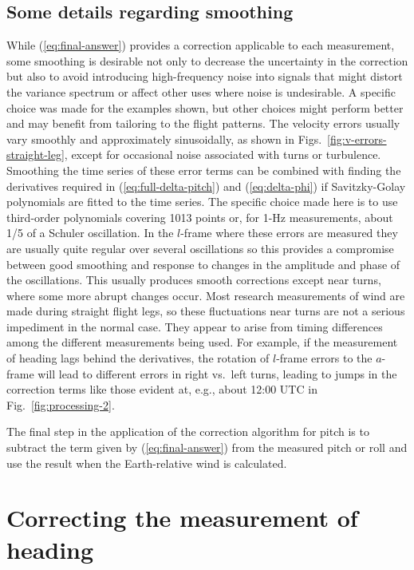 \documentclass[english,british,amt,bookmarks=false,unicode=true]{copernicus}\usepackage[]{graphicx}\usepackage[]{color}
\begin{document}
\subsection{Some details regarding smoothing}

While (\ref{eq:final-answer}) provides a correction applicable to
each measurement, some smoothing is desirable not only to decrease
the uncertainty in the correction but also to avoid introducing high-frequency
noise into signals that might distort the variance spectrum or affect
other uses where noise is undesirable. A specific choice was made
for the examples shown, but other choices might perform better and
may benefit from tailoring to the flight patterns. The velocity errors
usually vary smoothly and approximately sinusoidally, as shown in
Figs.~\ref{fig:v-errors-straight-leg}, except for occasional noise
associated with turns or turbulence. Smoothing the time series of
these error terms can be combined with finding the derivatives required
in (\ref{eq:full-delta-pitch}) and (\ref{eq:delta-phi}) if Savitzky-Golay
polynomials are fitted to the time series. The specific choice made
here is to use third-order polynomials covering 1013 points or, for
1-Hz measurements, about 1/5 of a Schuler oscillation. In the $l$-frame
where these errors are measured they are usually quite regular over
several oscillations so this provides a compromise between good smoothing
and response to changes in the amplitude and phase of the oscillations.
This usually produces smooth corrections except near turns, where
some more abrupt changes occur. Most research measurements of wind
are made during straight flight legs, so these fluctuations near turns
are not a serious impediment in the normal case. They appear to arise
from timing differences among the different measurements being used.
For example, if the measurement of heading lags behind the derivatives,
the rotation of $l$-frame errors to the $a$-frame will lead to different
errors in right vs.~left turns, leading to jumps in the correction
terms like those evident at, e.g., about 12:00 UTC in Fig.~\ref{fig:processing-2}.

The final step in the application of the correction algorithm for
pitch is to subtract the term given by (\ref{eq:final-answer}) from
the measured pitch or roll and use the result when the Earth-relative
wind is calculated. 


\section{Correcting the measurement of heading\label{sec:heading-correction}}
\end{document}
